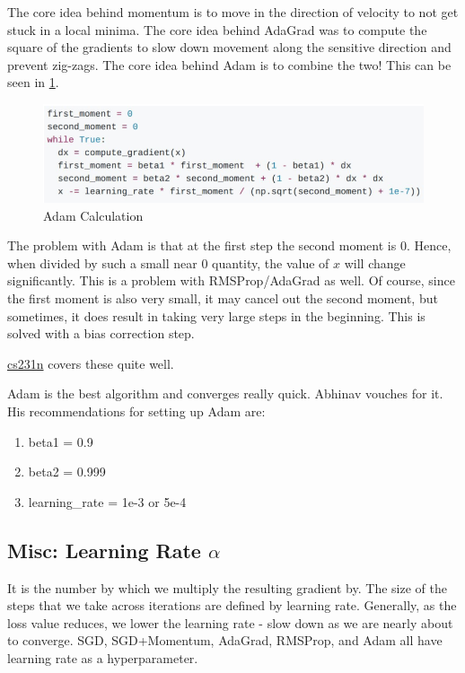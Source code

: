The core idea behind momentum is to move in the direction of velocity to not get stuck in a local minima. The core idea behind AdaGrad was to compute the square of the gradients to slow down movement along the sensitive direction and prevent zig-zags. The core idea behind Adam is to combine the two! This can be seen in \ref{fig:adam}.

\begin{figure}[h]
    \centering
    \includegraphics[width=12cm]{img/adam.png}
    \caption{Adam Calculation}
    \label{fig:adam}
\end{figure}

The problem with Adam is that at the first step the second moment is 0. Hence, when divided by such a small near 0 quantity, the value of $x$ will change significantly. This is a problem with RMSProp/AdaGrad as well. Of course, since the first moment is also very small, it may cancel out the second moment, but sometimes, it does result in taking very large steps in the beginning. This is solved with a bias correction step.

\href{https://youtu.be/_JB0AO7QxSA?t=2588}{cs231n} covers these quite well.

Adam is the best algorithm and converges really quick. Abhinav vouches for it. His recommendations for setting up Adam are:

\begin{enumerate}
    \item beta1 = 0.9
    \item beta2 = 0.999
    \item learning\_rate = 1e-3 or 5e-4
\end{enumerate}

\subsection{Misc: Learning Rate $\alpha$}

It is the number by which we multiply the resulting gradient by. The size of the steps that we take across iterations are defined by learning rate. Generally, as the loss value reduces, we lower the learning rate - slow down as we are nearly about to converge. SGD, SGD+Momentum, AdaGrad, RMSProp, and Adam all have learning rate as a hyperparameter.

